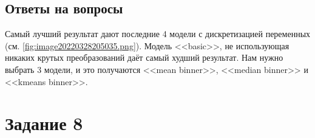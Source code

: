 \documentclass[12pt,a4paper]{article}
\begin{document}
\begin{Shaded}
\begin{Highlighting}[]
\OperatorTok{=}\NormalTok{: [], }\NormalTok{: [], }\NormalTok{: [], }\NormalTok{ : []\})}
\OperatorTok{=}
\OperatorTok{=}
\OperatorTok{=}\NormalTok{)}
\end{Highlighting}
\end{Shaded}
\begin{Shaded}
\begin{Highlighting}[]
\end{Highlighting}
\end{Shaded}
\begin{Shaded}
\begin{Highlighting}[]
\OperatorTok{=}\NormalTok{ np.array(models)[[}\NormalTok{,}\NormalTok{,}\NormalTok{]]}
\end{Highlighting}
\end{Shaded}

  \subsection{Ответы на вопросы}
  Самый лучший результат дают последние 4 модели с дискретизацией переменных (см. \autoref{fig:image20220328205035.png}).
  Модель <<basic>>, не использующая никаких крутых преобразований даёт самый худший результат.
  Нам нужно выбрать 3 модели, и это получаются <<mean binner>>, <<median binner>> и <<kmeans binner>>.

  \newpage
  \section{Задание 8}
\end{document}
